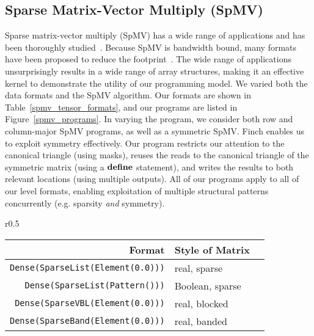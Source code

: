   \subsection{Sparse Matrix-Vector Multiply (SpMV)}
  Sparse matrix-vector multiply (SpMV) has a wide range of applications and has been thoroughly studied~\cite{liu_csr5_2015,
  zhou_enabling_2020}. 
  Because SpMV is bandwidth bound, many formats have
  been proposed to reduce the footprint~\cite{langr_evaluation_2016}. 
  The wide range of applications unsurprisingly
  results in a wide range of array structures, making it an effective kernel to
  demonstrate the utility of our programming model. 
  We varied both the data formats and the SpMV algorithm. 
  Our formats
  are shown in Table~\ref{spmv_tensor_formats}, and our programs are listed in
  Figure~\ref{spmv_programs}.
  In varying the program, we consider both row and column-major SpMV programs, as
  well as a symmetric SpMV. 
  Finch enables us to exploit symmetry
  effectively.
  Our program restricts our attention to the canonical triangle (using
  masks), reuses the reads to the canonical triangle of the symmetric matrix
  (using a $\text{\textbf{define}}$ statement), and writes the results to both relevant
  locations (using multiple outputs).
  All of our programs apply to all of our level formats, enabling exploitation of multiple structural patterns concurrently (e.g. sparsity \textit{and} symmetry).
   
  \begin{wrapfigure}{r}{0.5\linewidth}
    \scriptsize
    \centering
    \vspace{-14pt}
    \begin{tabular}{|r|l|l|}
        \hline
        \textbf{Format} & \textbf{Style of Matrix}\\
        \hline
        \texttt{Dense(SparseList(Element(0.0)))} & real, sparse \\
        \texttt{Dense(SparseList(Pattern()))} & Boolean, sparse \\
        \texttt{Dense(SparseVBL(Element(0.0)))} & real, blocked \\
        \texttt{Dense(SparseBand(Element(0.0)))} & real, banded \\
        \hline 
    \end{tabular}
      \vspace{-8pt}
    \caption{SpMV Tensor Formats}
    \label{spmv_tensor_formats}
    \vspace{-8pt}
  \end{wrapfigure} 

